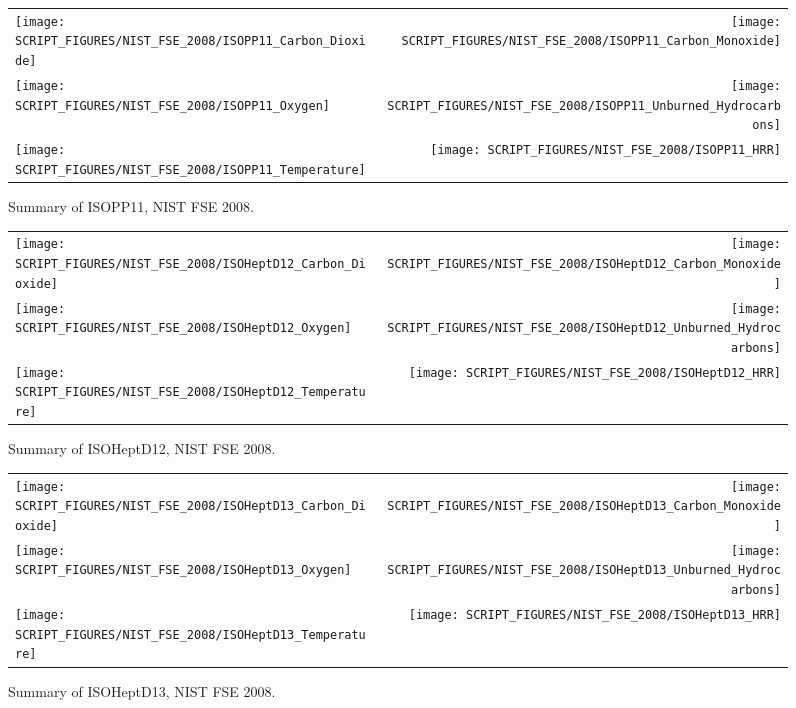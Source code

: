 \begin{figure}[p]
\begin{tabular*}{\textwidth}{l@{\extracolsep{\fill}}r}
\texttt{[image: SCRIPT\_FIGURES/NIST\_FSE\_2008/ISOPP11\_Carbon\_Dioxide]} &
\texttt{[image: SCRIPT\_FIGURES/NIST\_FSE\_2008/ISOPP11\_Carbon\_Monoxide]} \\
\texttt{[image: SCRIPT\_FIGURES/NIST\_FSE\_2008/ISOPP11\_Oxygen]} &
\texttt{[image: SCRIPT\_FIGURES/NIST\_FSE\_2008/ISOPP11\_Unburned\_Hydrocarbons]} \\
\texttt{[image: SCRIPT\_FIGURES/NIST\_FSE\_2008/ISOPP11\_Temperature]} &
\texttt{[image: SCRIPT\_FIGURES/NIST\_FSE\_2008/ISOPP11\_HRR]}
\end{tabular*}
\caption[Summary of ISOPP11, NIST FSE 2008]{Summary of ISOPP11, NIST FSE 2008.}
\label{NIST_FSE_1994_ISOPropylene11}
\end{figure}

\begin{figure}[p]
\begin{tabular*}{\textwidth}{l@{\extracolsep{\fill}}r}
\texttt{[image: SCRIPT\_FIGURES/NIST\_FSE\_2008/ISOHeptD12\_Carbon\_Dioxide]} &
\texttt{[image: SCRIPT\_FIGURES/NIST\_FSE\_2008/ISOHeptD12\_Carbon\_Monoxide]} \\
\texttt{[image: SCRIPT\_FIGURES/NIST\_FSE\_2008/ISOHeptD12\_Oxygen]} &
\texttt{[image: SCRIPT\_FIGURES/NIST\_FSE\_2008/ISOHeptD12\_Unburned\_Hydrocarbons]} \\
\texttt{[image: SCRIPT\_FIGURES/NIST\_FSE\_2008/ISOHeptD12\_Temperature]} &
\texttt{[image: SCRIPT\_FIGURES/NIST\_FSE\_2008/ISOHeptD12\_HRR]}
\end{tabular*}
\caption[Summary of ISOHeptD12, NIST FSE 2008]{Summary of ISOHeptD12, NIST FSE 2008.}
\label{NIST_FSE_1994_ISOHeptD12}
\end{figure}

\begin{figure}[p]
\begin{tabular*}{\textwidth}{l@{\extracolsep{\fill}}r}
\texttt{[image: SCRIPT\_FIGURES/NIST\_FSE\_2008/ISOHeptD13\_Carbon\_Dioxide]} &
\texttt{[image: SCRIPT\_FIGURES/NIST\_FSE\_2008/ISOHeptD13\_Carbon\_Monoxide]} \\
\texttt{[image: SCRIPT\_FIGURES/NIST\_FSE\_2008/ISOHeptD13\_Oxygen]} &
\texttt{[image: SCRIPT\_FIGURES/NIST\_FSE\_2008/ISOHeptD13\_Unburned\_Hydrocarbons]} \\
\texttt{[image: SCRIPT\_FIGURES/NIST\_FSE\_2008/ISOHeptD13\_Temperature]} &
\texttt{[image: SCRIPT\_FIGURES/NIST\_FSE\_2008/ISOHeptD13\_HRR]}
\end{tabular*}
\caption[Summary of ISOHeptD13, NIST FSE 2008]{Summary of ISOHeptD13, NIST FSE 2008.}
\label{NIST_FSE_1994_ISOHeptD13}
\end{figure}

